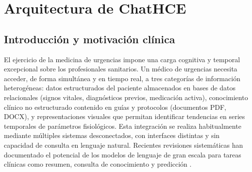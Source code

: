 %
%
%

\chapter{Arquitectura de ChatHCE}
\label{cap:arquitectura}

\section{Introducción y motivación clínica}
\label{sec:introduccion}

El ejercicio de la medicina de urgencias impone una carga cognitiva y temporal excepcional sobre los profesionales sanitarios. Un médico de urgencias necesita acceder, de forma simultánea y en tiempo real, a tres categorías de información heterogéneas: datos estructurados del paciente almacenados en bases de datos relacionales (signos vitales, diagnósticos previos, medicación activa), conocimiento clínico no estructurado contenido en guías y protocolos (documentos PDF, DOCX), y representaciones visuales que permitan identificar tendencias en series temporales de parámetros fisiológicos. Esta integración se realiza habitualmente mediante múltiples sistemas desconectados, con interfaces distintas y sin capacidad de consulta en lenguaje natural. Recientes revisiones sistemáticas han documentado el potencial de los modelos de lenguaje de gran escala para tareas clínicas como resumen, consulta de conocimiento y predicción \parencite{wang2024chatgpt}.

